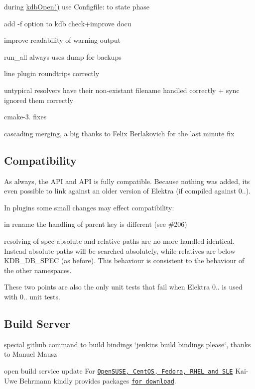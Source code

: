 \begin{DoxyItemize}
\item during \hyperlink{group__kdb_ga6808defe5870f328dd17910aacbdc6ca}{kdb\+Open()} use Configfile\+: to state phase
\item add -\/f option to kdb check+improve docu
\item improve readability of warning output
\item run\+\_\+all always uses dump for backups
\item line plugin roundtrips correctly
\item untypical resolvers have their non-\/existant filename handled correctly + sync ignored them correctly
\item cmake-\/3. fixes
\item cascading merging, a big thanks to Felix Berlakovich for the last minute fix
\end{DoxyItemize}

\subsection*{Compatibility}

As always, the A\+P\+I and A\+P\+I is fully compatible. Because nothing was added, its even possible to link against an older version of Elektra (if compiled against 0..).

In plugins some small changes may effect compatibility\+:
\begin{DoxyItemize}
\item in rename the handling of parent key is different (see \#206)
\item resolving of spec absolute and relative paths are no more handled identical. Instead absolute paths will be searched absolutely, while relatives are below K\+D\+B\+\_\+\+D\+B\+\_\+\+S\+P\+E\+C (as before). This behaviour is consistent to the behaviour of the other namespaces.
\end{DoxyItemize}

These two points are also the only unit tests that fail when Elektra 0.. is used with 0.. unit tests.

\subsection*{Build Server}


\begin{DoxyItemize}
\item special github command to build bindings \char`\"{}jenkins build bindings please\char`\"{}, thanks to Manuel Mausz
\item open build service update For \href{https://build.opensuse.org/package/show/home:bekun:devel/elektra}{\tt Open\+S\+U\+S\+E, Cent\+O\+S, Fedora, R\+H\+E\+L and S\+L\+E} Kai-\/\+Uwe Behrmann kindly provides packages \href{http://software.opensuse.org/download.html?project=home%3Abekun%3Adevel&package=libelektra4}{\tt for download}.
\end{DoxyItemize}

